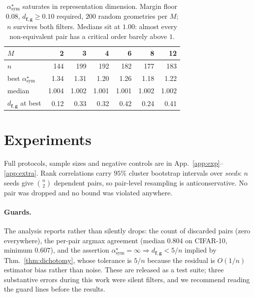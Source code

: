 \documentclass[10pt,letterpaper,twocolumn]{article}
\newcommand{\bff}{\mathbf{f}}
\newcommand{\bfg}{\mathbf{g}}
\newcommand{\dfg}{d_{\bff,\bfg}}
\theoremstyle{plain}
\theoremstyle{definition}
\theoremstyle{remark}
\begin{document}
\begin{table}[t]
\centering\small
\caption{$\alpha^{\star}_{\mathrm{sym}}$ saturates in representation dimension.
Margin floor $0.08$, $\dfg\ge0.10$ required, $200$ random geometries per $M$;
$n$ survives both filters. Medians sit at $1.00$: almost every non-equivalent
pair has a critical order barely above $1$.}
\label{tab:mscale}
\begin{tabular}{@{}lrrrrrr@{}}
\toprule
$M$ & 2 & 3 & 4 & 6 & 8 & 12 \\
\midrule
$n$                                  & 144 & 199 & 192 & 182 & 177 & 183 \\
best $\alpha^{\star}_{\mathrm{sym}}$ & 1.34 & 1.31 & 1.20 & 1.26 & 1.18 & 1.22 \\
median                               & 1.004 & 1.002 & 1.001 & 1.001 & 1.002 & 1.002 \\
$\dfg$ at best                       & 0.12 & 0.33 & 0.32 & 0.42 & 0.24 & 0.41 \\
\bottomrule
\end{tabular}
\end{table}

\section{Experiments}
\label{sec:exp}

Full protocols, sample sizes and negative controls are in
App.~\ref{app:exp}--\ref{app:extra}. Rank correlations carry $95\%$ cluster
bootstrap intervals over \emph{seeds}: $n$ seeds give $\binom{n}{2}$ dependent
pairs, so pair-level resampling is anticonservative. No pair was dropped and no
bound was violated anywhere.

\paragraph{Guards.}
The analysis reports rather than silently drops: the count of discarded pairs
(zero everywhere), the per-pair argmax agreement (median $0.804$ on CIFAR-10,
minimum $0.607$), and the assertion
$\alpha^{\star}_{\mathrm{sym}}=\infty\Rightarrow\dfg<5/n$ implied by
Thm.~\ref{thm:dichotomy}, whose tolerance is $5/n$ because the residual is
$O(1/n)$ estimator bias rather than noise. These are released as a test suite;
three substantive errors during this work were silent filters, and we recommend
reading the guard lines before the results.
\end{document}
